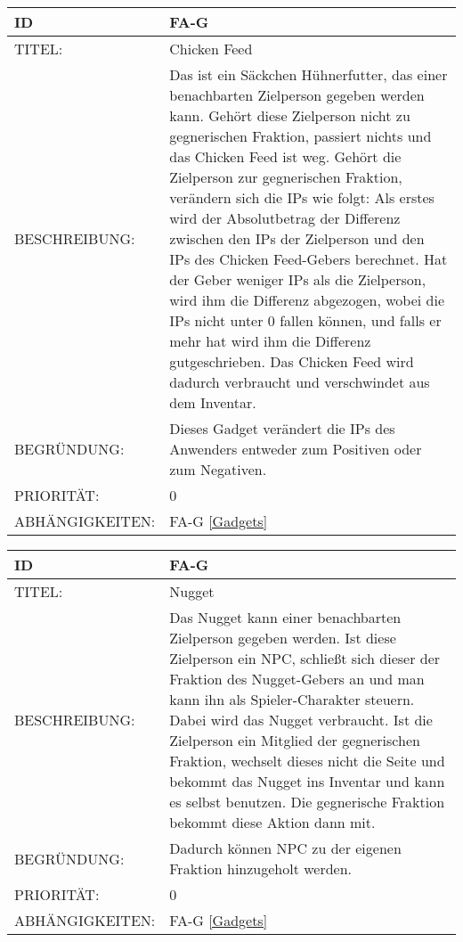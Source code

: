 \begin{tabularx}{16cm}{l|X}
	{table}\label{Chicken Feed}
	\textbf{ID} & \textbf{FA-G \arabic{table}} \\
	\hline
	TITEL: & Chicken Feed \\
	\hline
	BESCHREIBUNG: & Das ist ein Säckchen Hühnerfutter, das einer benachbarten Zielperson gegeben werden kann. Gehört diese Zielperson nicht zu gegnerischen Fraktion, passiert nichts und das Chicken Feed ist weg. Gehört die Zielperson zur gegnerischen Fraktion, verändern sich die IPs wie folgt: Als erstes wird der Absolutbetrag der Differenz zwischen den IPs der Zielperson und den IPs des Chicken Feed-Gebers berechnet. Hat der Geber weniger IPs als die Zielperson, wird ihm die Differenz abgezogen, wobei die IPs nicht unter 0 fallen können, und falls er mehr hat wird ihm die Differenz gutgeschrieben. Das Chicken Feed wird dadurch verbraucht und verschwindet aus dem Inventar. \\
	\hline
	BEGRÜNDUNG: &  Dieses Gadget verändert die IPs des Anwenders entweder zum Positiven oder zum Negativen. \\
	\hline
	PRIORITÄT: & 0\\
	\hline
	ABHÄNGIGKEITEN: & FA-G \ref{Gadgets} \\
\end{tabularx}

\begin{tabularx}{16cm}{l|X}
	{table}\label{Nugget}
	\textbf{ID} & \textbf{FA-G \arabic{table}} \\
	\hline
	TITEL: & Nugget \\
	\hline
	BESCHREIBUNG: & Das Nugget kann einer benachbarten Zielperson gegeben werden. Ist diese Zielperson ein NPC, schließt sich dieser der Fraktion des Nugget-Gebers an und man kann ihn als Spieler-Charakter steuern. Dabei wird das Nugget verbraucht. Ist die Zielperson ein Mitglied der gegnerischen Fraktion, wechselt dieses nicht die Seite und bekommt das Nugget ins Inventar und kann es selbst benutzen. Die gegnerische Fraktion bekommt diese Aktion dann mit. \\
	\hline
	BEGRÜNDUNG: &  Dadurch können NPC zu der eigenen Fraktion hinzugeholt werden. \\
	\hline
	PRIORITÄT: & 0\\
	\hline
	ABHÄNGIGKEITEN: & FA-G \ref{Gadgets} \\
\end{tabularx}

